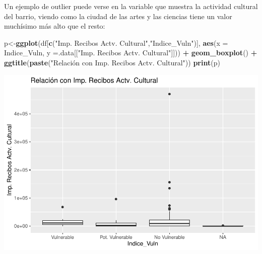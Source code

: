 \documentclass[notspecified,article,submit,moreauthors,pdftex]{Definitions/mdpi}
\newenvironment{Shaded}{\begin{snugshade}}{\end{snugshade}}
\newcommand{\AttributeTok}[1]{\textcolor[rgb]{0.13,0.29,0.53}{#1}}
\newcommand{\FunctionTok}[1]{\textcolor[rgb]{0.13,0.29,0.53}{\textbf{#1}}}
\newcommand{\NormalTok}[1]{#1}
\newcommand{\OtherTok}[1]{\textcolor[rgb]{0.56,0.35,0.01}{#1}}
\newcommand{\SpecialCharTok}[1]{\textcolor[rgb]{0.81,0.36,0.00}{\textbf{#1}}}
\newcommand{\StringTok}[1]{\textcolor[rgb]{0.31,0.60,0.02}{#1}}
\begin{document}
Un ejemplo de outlier puede verse en la variable que muestra la
actividad cultural del barrio, viendo como la ciudad de las artes y las
ciencias tiene un valor muchísimo más alto que el resto:

\begin{Shaded}
\begin{Highlighting}[]
\NormalTok{p}\OtherTok{\textless{}{-}}\FunctionTok{ggplot}\NormalTok{(df[}\FunctionTok{c}\NormalTok{(}\StringTok{"Imp. Recibos Actv. Cultural"}\NormalTok{,}\StringTok{"Indice\_Vuln"}\NormalTok{)], }\FunctionTok{aes}\NormalTok{(}\AttributeTok{x =}\NormalTok{ Indice\_Vuln, }\AttributeTok{y =}\NormalTok{.data[[}\StringTok{"Imp. Recibos Actv. Cultural"}\NormalTok{]])) }\SpecialCharTok{+}
    \FunctionTok{geom\_boxplot}\NormalTok{() }\SpecialCharTok{+} 
    \FunctionTok{ggtitle}\NormalTok{(}\FunctionTok{paste}\NormalTok{(}\StringTok{"Relación con Imp. Recibos Actv. Cultural"}\NormalTok{))}
  \FunctionTok{print}\NormalTok{(p)}
\end{Highlighting}
\end{Shaded}

\begin{center}\includegraphics{./figure/unnamed-chunk-37-1} \end{center}

\begin{Shaded}
\end{Shaded}
\end{document}
